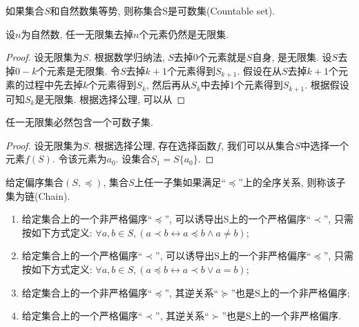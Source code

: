 \begin{definition}[可数集]
	如果集合$S$和自然数集等势, 则称集合S是可数集(Countable set).
\end{definition}

\begin{proposition}
	设$n$为自然数, 任一无限集去掉$n$个元素仍然是无限集.
\end{proposition}

\begin{proof}
	设无限集为$S$. 根据数学归纳法, $S$去掉0个元素就是$S$自身, 是无限集. 设$S$去掉$0-k$个元素是无限集. 令$S$去掉$k+1$个元素得到$S_{k+1}$. 假设在从$S$去掉$k+1$个元素的过程中先去掉$k$个元素得到$S_k$, 然后再从$S_k$中去掉1个元素得到$S_{k+1}$. 根据假设可知$S_k$是无限集. 根据选择公理, 可以从
\end{proof}

\begin{proposition}
	任一无限集必然包含一个可数子集.
\end{proposition}

\begin{proof}
	设无限集为$S$. 根据选择公理, 存在选择函数$f$, 我们可以从集合$S$中选择一个元素$f(S)$. 令该元素为$a_0$. 设集合$S_1=S\{a_0\}$. 
\end{proof}

\begin{definition}[势]
	给定偏序集合$(S,\preccurlyeq)$, 集合$S$上任一子集如果满足``$\preccurlyeq$''上的全序关系, 则称该子集为链(Chain).
\end{definition}

\begin{proposition}
	\begin{enumerate}
		\item 给定集合上的一个非严格偏序``$\preccurlyeq$'', 可以诱导出S上的一个严格偏序``$\prec$'', 只需按如下方式定义: $\forall a,b\in S, (a\prec b\leftrightarrow a\preccurlyeq b \wedge a\neq b)$;
		\item 给定集合上的一个严格偏序``$\prec$'', 可以诱导出S上的一个非严格偏序``$\preccurlyeq$'', 只需按如下方式定义: $\forall a,b\in S, (a\preccurlyeq b\leftrightarrow a\prec b \vee a=b)$;
		\item 给定集合上的一个非严格偏序``$\preccurlyeq$'', 其逆关系``$\succcurlyeq$''也是S上的一个非严格偏序;
		\item 给定集合上的一个严格偏序``$\prec$'', 其逆关系``$\succ$''也是S上的一个非严格偏序.
	\end{enumerate}
\end{proposition}

